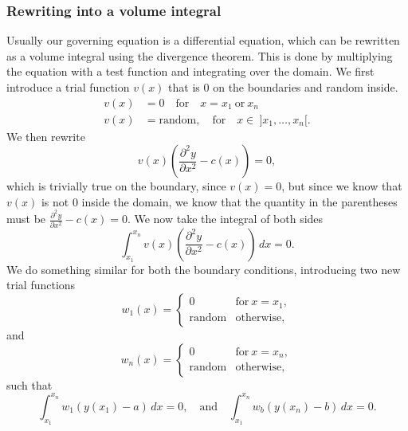\documentclass[acmtog]{acmart}
\begin{document}
\subsubsection{Rewriting into a volume integral}
Usually our governing equation is a differential equation, which can be
rewritten as a volume integral using the divergence theorem. This is done by
multiplying the equation with a test function and integrating over the domain.
We first introduce a trial function $v(x)$ that is 0 on the boundaries and
random inside.
%
\begin{align}
  v(x) & = 0 \quad \text{for} \quad x = x_1 \ \text{or} \ x_n                 \\
  v(x) & = \mathrm{random}, \quad \text{for} \quad x \in \ ]x_1, \dots, x_n[.
\end{align}
%
We then rewrite
%
\begin{equation}
  v(x) \left( \frac{ \partial^{2} y }{ \partial x^{2} }  - c(x) \right) = 0,
\end{equation}
which is trivially true on the boundary, since $v(x) = 0$, but since we know that $v(x)$ is not 0 inside the domain, we know that the quantity in the parentheses must be $\frac{ \partial^{2} y }{ \partial x^{2} } - c(x) = 0$.
%
We now take the integral of both sides
%
\begin{equation}
  \int_{x_1}^{x_n} v(x) \left( \frac{\partial^{2} y }{ \partial x^{2} } - c(x) \right) \, dx = 0.
\end{equation}
%
We do something similar for both the boundary conditions, introducing two new
trial functions
%
\begin{equation}
  w_1(x) = \begin{cases}
    0               & \text{for} \ x = x_1, \\
    \mathrm{random} & \text{otherwise},
  \end{cases}
\end{equation}
%
and
%
\begin{equation}
  w_n(x) = \begin{cases}
    0               & \text{for} \ x = x_n, \\
    \mathrm{random} & \text{otherwise},
  \end{cases}
\end{equation}
%
such that
%
\begin{equation}
  \int_{x_1}^{x_n} w_1 \left( y(x_1) - a \right) \, dx = 0, \quad \mathrm{and} \quad \int_{x_1}^{x_n} w_b \left( y(x_n) - b \right) \, dx = 0.
\end{equation}
\end{document}
